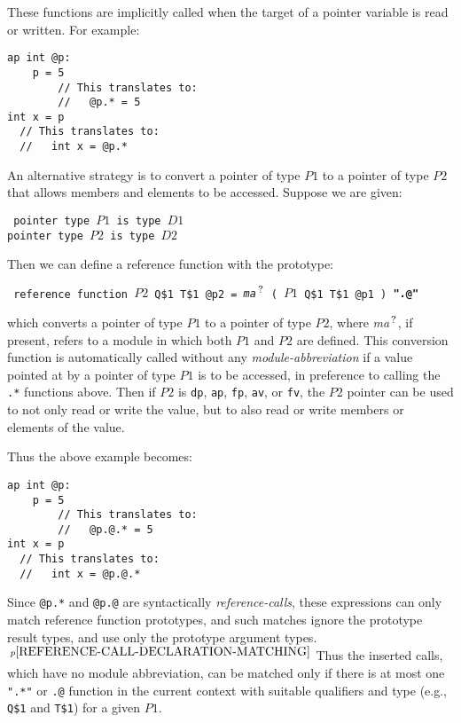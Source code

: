 \documentclass[12pt]{article}
\newcommand{\QMARK}{{$^{\,\mbox{\footnotesize ?}}$}}
\newcommand{\ttkey}[1]{{\tt \bfseries #1}}
\newcommand{\pagnote}[1]{$\,^{p\pageref{#1}}$}
\newenvironment{indpar}[1][0.3in]%
	{\begin{list}{}%
		     {\setlength{\itemsep}{0in}%
		      \setlength{\topsep}{0in}%
		      \setlength{\parsep}{1ex}%
		      \setlength{\labelwidth}{#1}%
		      \setlength{\leftmargin}{#1}%
		      \addtolength{\leftmargin}{\labelsep}}%
	 \item}%
	{\end{list}}
\begin{document}
These functions are implicitly called when the target
of a pointer variable is read or written.  For example:
\begin{indpar}\begin{verbatim}
ap int @p:
    p = 5
        // This translates to:
        //   @p.* = 5
int x = p
  // This translates to:
  //   int x = @p.*
\end{verbatim}\end{indpar}

An alternative strategy is to convert a pointer of type $P1$
to a pointer of type $P2$ that allows members and elements
to be accessed.  Suppose we are given:
\begin{indpar} \tt
pointer type $P1$ is type $D1$ \\
pointer type $P2$ is type $D2$
\end{indpar}

Then we can define a reference function with the prototype:
\begin{indpar} \tt
reference function $P2$ Q\$1 T\$1 @p2 =
    {\em ma}\QMARK{} ( $P1$ Q\$1 T\$1 @p1 ) \ttkey{".@"}
\end{indpar}
which converts a pointer of type $P1$ to a pointer of type $P2$,
where {\em ma}\QMARK{}, if present, refers to a module in which
both $P1$ and $P2$ are defined.
This conversion function is automatically called without any
{\em module-abbreviation} if a value pointed at by a pointer of type $P1$ is to
be accessed, in preference to calling the {\tt .*} functions above.
Then if $P2$ is {\tt dp}, {\tt ap}, {\tt fp}, {\tt av},
or {\tt fv}, the $P2$ pointer can be used to not only read or write
the value, but to also read or write members or elements of the
value.

Thus the above example becomes:
\begin{indpar}\begin{verbatim}
ap int @p:
    p = 5
        // This translates to:
        //   @p.@.* = 5
int x = p
  // This translates to:
  //   int x = @p.@.*
\end{verbatim}\end{indpar}

Since {\tt @p.*} and {\tt @p.@} are syntactically
{\em reference-calls}, these expressions
can only match reference function prototypes, and such matches
ignore the prototype result types, and use only the prototype
argument types.\pagnote{REFERENCE-CALL-DECLARATION-MATCHING}
Thus the inserted calls, which have no
module abbreviation, can be matched only if there
is at most one {\tt ".*"} or {\tt .@} function in the current context
with suitable qualifiers and type (e.g., {\tt Q\$1} and {\tt T\$1})
for a given $P1$.
\end{document}

